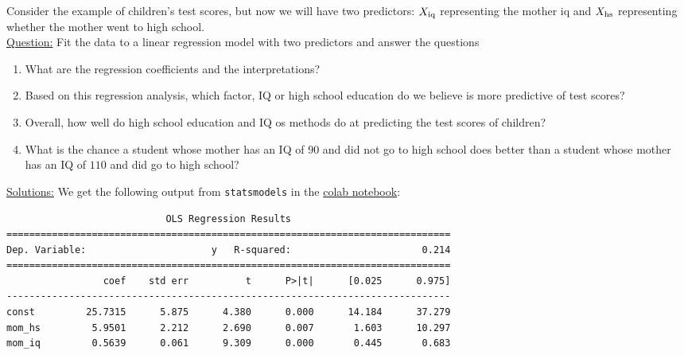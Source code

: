\begin{itemize}
\begin{example}
Consider the example of children's test scores, but now we will have two predictors: $X_{\rm iq}$ representing the mother iq and $X_{\rm hs}$ representing whether the mother went to high school. \\


\noindent
\underline{Question:} Fit the data to a linear regression model with two predictors and answer the questions
\begin{enumerate}[label=(\alph*)]
\item What are the regression coefficients and the interpretations? 
\item Based on this regression analysis, which factor, IQ or high school education do we believe is more predictive of test scores? 
\item Overall, how well do high school education and IQ os methods do at predicting the test scores of children? 
\item What is the chance a student whose mother has an IQ of $90$ and did not go to high school does better than a student whose mother has an IQ of $110$ and did go to high school?\\
\end{enumerate}



\noindent
\underline{Solutions:}
We get the following output from \verb!statsmodels! in the \href{https://colab.research.google.com/drive/1oIRgP_7-c5DGV1D2iz5nj406mZfJxUIG?usp=sharing}{colab notebook}:\\

\noindent
\begin{Verbatim}
                            OLS Regression Results                            
==============================================================================
Dep. Variable:                      y   R-squared:                       0.214                                   
==============================================================================
                 coef    std err          t      P>|t|      [0.025      0.975]
------------------------------------------------------------------------------
const         25.7315      5.875      4.380      0.000      14.184      37.279
mom_hs         5.9501      2.212      2.690      0.007       1.603      10.297
mom_iq         0.5639      0.061      9.309      0.000       0.445       0.683



\end{Verbatim}
\end{example}
\end{itemize}
